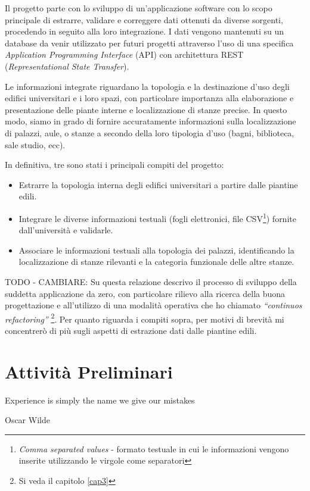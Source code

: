 \documentclass[12pt]{report}
\begin{document}
Il progetto parte con lo sviluppo di un'applicazione software con 
lo scopo principale di estrarre, validare e correggere dati 
ottenuti da diverse sorgenti, procedendo in seguito alla loro 
integrazione. I dati vengono mantenuti su un database da venir 
utilizzato per futuri progetti attraverso l'uso di una specifica 
\textit{Application Programming Interface} (API) con architettura REST 
(\textit{Representational State Transfer}). 

Le informazioni integrate riguardano la topologia e la destinazione
d'uso degli edifici universitari e i loro spazi, con particolare
importanza alla elaborazione e presentazione delle piante interne e
localizzazione di stanze precise. In questo modo, siamo in grado di
fornire accuratamente informazioni sulla localizzazione di palazzi,
aule, o stanze a secondo della loro tipologia d'uso (bagni, 
biblioteca, sale studio, ecc).

In definitiva, tre sono stati i principali compiti del progetto:
\begin{itemize}
  \item Estrarre la topologia interna degli edifici universitari a
partire dalle piantine edili.
  \item Integrare le diverse informazioni testuali (fogli elettronici,
file CSV\footnote{\textit{Comma separated values} - formato testuale
in cui le informazioni vengono inserite utilizzando le virgole come
separatori}) fornite dall'università e validarle.
  \item Associare le informazioni testuali alla topologia dei palazzi,
identificando la localizzazione di stanze rilevanti e la categoria
funzionale delle altre stanze.
\end{itemize}


TODO - CAMBIARE:
Su questa relazione descrivo il processo di sviluppo della suddetta
applicazione da zero, con particolare rilievo alla ricerca della buona
progettazione e all'utilizzo di una modalità operativa che ho chiamato
\textit{“continuos refactoring”} \footnote{Si veda il capitolo
\ref{cap3}}. Per quanto riguarda i compiti sopra, per motivi di
brevità mi concentrerò di più sugli aspetti di estrazione dati
dalle piantine edili.

% 
% 
\chapter{Attività Preliminari}
\label{cap2}

\epigraph{Experience is simply the name we give our mistakes}{Oscar Wilde}
\end{document}
